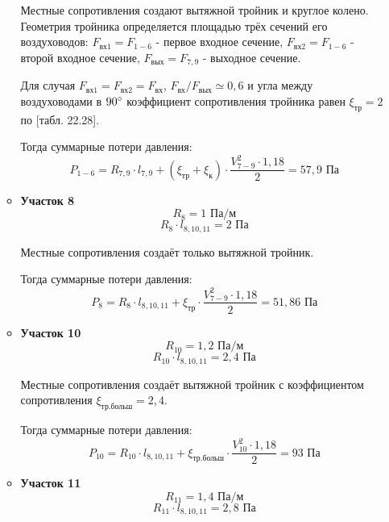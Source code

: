 \begin{enumerate}
\begin{itemize}
                    Местные сопротивления создают вытяжной тройник и круглое колено.
                    Геометрия тройника определяется площадью трёх сечений его воздуховодов:
                    $F_\text{вх1} = F_{1-6}$ - первое входное сечение,
                    $F_\text{вх2} = F_{1-6}$ - второй входное сечение,
                    $F_\text{вых} = F_{7,9}$ - выходное сечение.

                    Для случая $F_\text{вх1} = F_\text{вх2} = F_\text{вх}$,
                    $F_\text{вх} / F_\text{вых} \simeq 0,6$ и угла между воздуховодами
                    в $90 \degree$ коэффициент сопротивления
                    тройника равен $\xi_\text{тр} = 2$ по
                    \cite{air_ventilation_and_conditioning}[табл. 22.28].

                    Тогда суммарные потери давления:
                    $$
                        P_{1-6} = R_{7,9} \cdot l_{7,9}
                                    + (\xi_\text{тр} + \xi_\text{к}) \cdot \frac{V_{7-9}^2 \cdot 1,18}{2}
                                = 57,9 \text{ Па}
                    $$

            \item   \textbf{Участок 8}
                    $$
                        R_{8} = 1 \text{ Па/м}
                    $$
                    $$
                        R_{8} \cdot l_{8,10,11} = 2 \text{ Па}
                    $$

                    Местные сопротивления создаёт только вытяжной тройник.

                    Тогда суммарные потери давления:
                    $$
                        P_{8} = R_{8} \cdot l_{8,10,11}
                                    + \xi_\text{тр} \cdot \frac{V_{7-9}^2 \cdot 1,18}{2}
                                = 51,86 \text{ Па}
                    $$

            \item   \textbf{Участок 10}
                    $$
                        R_{10} = 1,2 \text{ Па/м}
                    $$
                    $$
                        R_{10} \cdot l_{8,10,11} = 2,4 \text{ Па}
                    $$

                    Местные сопротивления создаёт вытяжной тройник с коэффициентом
                    сопротивления $\xi_\text{тр.больш} = 2,4$.

                    Тогда суммарные потери давления:
                    $$
                        P_{10} = R_{10} \cdot l_{8,10,11}
                                    + \xi_\text{тр.больш} \cdot \frac{V_{10}^2 \cdot 1,18}{2}
                                = 93 \text{ Па}
                    $$
            \item   \textbf{Участок 11}
                    $$
                        R_{11} = 1,4 \text{ Па/м}
                    $$
                    $$
                        R_{11} \cdot l_{8,10,11} = 2,8 \text{ Па}
                    $$


\end{itemize}
\end{enumerate}
